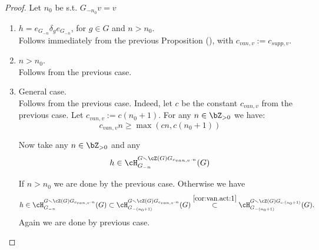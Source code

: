 \documentclass[12pt,a4paper]{amsart}%
\begin{document}
\begin{proof}
Let $n_0$ be s.t. $G_{-n_0}v=v$
$ $
\begin{enumerate}[{Case} 1.]
\item $h=e_{G_{-n}}\delta_{g} e_{G_{-n}}$, for $g\in G$ and $n>n_0$.\\
Follows immediately from the previous Proposition (), with
$c_{van,v}:=c_{supp,v}$.
\item $n>n_0$.\\
Follows from the previous case.
\item General case.\\
Follows from the previous case. Indeed, let $c$ be the constant $c_{van,v}$ from the previous case. Let $c_{van,v}:=c(n_0+1)$.
For any $n\in \Z_{>0}$ we have: 
\begin{equation}\label{cor:van.act:1}
c_{van,v}n \geq \max(cn,c(n_0+1))    
\end{equation}

Now take 
any $n\in \Z_{>0}$ and any $$h\in \cH_{G_{-n}}^{G  \smallsetminus \cZ(G)G_{c_{van,v}\cdot n}}(G)$$

If $n> n_0$ we are done by the previous case. Otherwise we have 
$$h\in \cH_{G_{-n}}^{G  \smallsetminus \cZ(G)G_{c_{van,v}\cdot n}}(G)\subset \cH_{G_{-(n_0+1)}}^{G  \smallsetminus \cZ(G)G_{c_{van,v}\cdot n}}(G)\overset{\eqref{cor:van.act:1}}{\subset} \cH_{G_{-(n_0+1)}}^{G  \smallsetminus \cZ(G)G_{c\cdot ({n_0+1})}}(G).$$   Again we are done by previous case.
\end{enumerate}
    
\end{proof}
\end{document}
